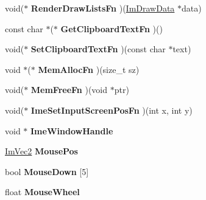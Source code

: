 \begin{DoxyCompactItemize}
\item 
\mbox{\label{struct_im_gui_i_o_ae16a9f25f36fe9706d8a33fb128e538a}} 
void($\ast$ {\bfseries Render\+Draw\+Lists\+Fn} )(\mbox{\hyperlink{struct_im_draw_data}{Im\+Draw\+Data}} $\ast$data)
\item 
\mbox{\label{struct_im_gui_i_o_ad13990773d3924d3c804dac34edd5a02}} 
const char $\ast$($\ast$ {\bfseries Get\+Clipboard\+Text\+Fn} )()
\item 
\mbox{\label{struct_im_gui_i_o_af37308287642b13ef522992854792b24}} 
void($\ast$ {\bfseries Set\+Clipboard\+Text\+Fn} )(const char $\ast$text)
\item 
\mbox{\label{struct_im_gui_i_o_a352f6f0770974ee173f84d99d9e50a6e}} 
void $\ast$($\ast$ {\bfseries Mem\+Alloc\+Fn} )(size\+\_\+t sz)
\item 
\mbox{\label{struct_im_gui_i_o_adb56df4e96ab8a9f1aefe8dd474ba0f5}} 
void($\ast$ {\bfseries Mem\+Free\+Fn} )(void $\ast$ptr)
\item 
\mbox{\label{struct_im_gui_i_o_ac59559342608fbdeb14778a4fd57c301}} 
void($\ast$ {\bfseries Ime\+Set\+Input\+Screen\+Pos\+Fn} )(int x, int y)
\item 
\mbox{\label{struct_im_gui_i_o_a8baa252c4f76764eb866b920f227cfa2}} 
void $\ast$ {\bfseries Ime\+Window\+Handle}
\item 
\mbox{\label{struct_im_gui_i_o_ad2e9e547cb4d2abe8e7d27407efffeb8}} 
\mbox{\hyperlink{struct_im_vec2}{Im\+Vec2}} {\bfseries Mouse\+Pos}
\item 
\mbox{\label{struct_im_gui_i_o_a8f4613baafc93026175d9cdaf4e82d21}} 
bool {\bfseries Mouse\+Down} \mbox{[}5\mbox{]}
\item 
\mbox{\label{struct_im_gui_i_o_a21d3ca4928989a2c838b7b4ea95e5824}} 
float {\bfseries Mouse\+Wheel}
\item 
\mbox{\label{struct_im_gui_i_o_a9b240460966bf2bd35c30f27b8db4028}} 

\end{DoxyCompactItemize}
